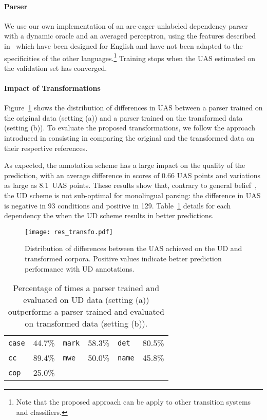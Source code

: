 \documentclass[11pt,letterpaper]{article}
\newcommand{\dep}[1]{\texttt{#1}}
\begin{document}
\paragraph*{Parser} We use our own implementation of an arc-eager
unlabeled dependency parser with a dynamic oracle and an averaged
perceptron, using the features described in~\cite{zhang11transition}
which have been designed for English and have not been adapted to the
specificities of the other languages.\footnote{Note that the proposed
  approach can be apply to other transition systems and classifiers.}
Training stops when the UAS estimated on the validation set has
converged.

\paragraph*{Impact of Transformations}
Figure~\ref{fig:distrib_uas_diff} shows the distribution of
differences in UAS between a parser trained on the original data
(setting (a)) and a parser trained on the transformed data (setting
(b)). To evaluate the proposed transformations, we follow the approach
introduced in \cite{schwartz12learnability} consisting in comparing
the original and the transformed data on their respective
references.%

As expected, the annotation scheme has a large impact on the quality
of the prediction, with an average difference in scores of 0.66 UAS
points and variations as large as 8.1~UAS points. These results show
that, contrary to general
belief~\cite{schwartz12learnability,kohita17multilingual}, the UD
scheme is not sub-optimal for monolingual parsing: the difference in
UAS is negative in 93 conditions and positive in
129. Table~\ref{tab:uas_diff} details for each dependency the when the
UD scheme results in better predictions.

\begin{figure}[h]
  \texttt{[image: res\_transfo.pdf]}
  \caption{Distribution of differences between the UAS achieved on the
    UD and transformed corpora. Positive values indicate better prediction performance with UD annotations.
    \label{fig:distrib_uas_diff}}
\end{figure}

\def\arraystretch{0.7}
\begin{table}[h]
  \begin{tabular}{@{~}l@{~~}c@{~~~~~}l@{~~}c@{~~~~~}l@{~~}c@{~}}
    \toprule
    \dep{case}        &  44.7\% & \dep{mark}        &  58.3\% & \dep{det}         &  80.5\% \\
    \dep{cc}          &  89.4\% & \dep{mwe}         &  50.0\% & \dep{name}        &  45.8\% \\
    \dep{cop}         &  25.0\% \\
    \bottomrule
  \end{tabular}
  \centering
  \caption{Percentage of times a parser trained and evaluated on UD
    data (setting (a)) outperforms a parser trained and evaluated on
    transformed data (setting (b)).\label{tab:uas_diff}}
\end{table}
\end{document}
